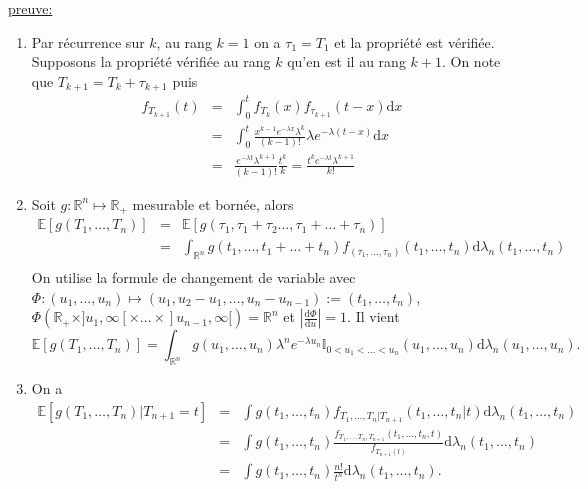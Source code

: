 \documentclass[8pt,notheorems]{beamer}
\theoremstyle{definition}
\theoremstyle{example}
\theoremstyle{mystyle}
\theoremstyle{plain}
\begin{document}
\begin{frame}[allowframebreaks]
\underline{preuve:}
\begin{enumerate}
\item Par récurrence sur $k$, au rang $k=1$ on a $\tau_1= T_1$ et la propriété est vérifiée. Supposons la propriété vérifiée au rang $k$ qu'en est il au rang $k+1$. On note que $T_{k+1}=T_k+\tau_{k+1}$ puis
\begin{eqnarray*}
f_{T_{k+1}}(t)&=&\int_{0}^{t}f_{T_k}(x)f_{\tau_{k+1}}(t-x)\text{d}x\\
&=&\int_{0}^{t}\frac{x^{k-1}e^{-\lambda x}\lambda^k}{(k-1)!}\lambda e^{-\lambda(t-x)}\text{d}x\\
&=&\frac{e^{-\lambda t}\lambda^{k+1}}{(k-1)!}\frac{t^k}{k}=\frac{t^k e^{-\lambda t}\lambda^{k+1}}{k!}
\end{eqnarray*}
\item Soit $g:\mathbb{R}^n\mapsto \mathbb{R}_+$ mesurable et bornée, alors
\begin{eqnarray*}
\mathbb{E}[g(T_{1},\ldots,T_n)]&=& \mathbb{E}[g(\tau_{1},\tau_1+\tau_2\ldots,\tau_1+\ldots+ \tau_n)]\\
&=&\int_{\mathbb{R}^n}g(t_{1},\ldots,t_1+\ldots+ t_n)f_{(\tau_{1},\ldots,\tau_n)}(t_1,\ldots,t_n)\text{d}\lambda_n(t_{1},\ldots,t_n)\\
\end{eqnarray*}
On utilise la formule de changement de variable avec $\Phi:(u_{1},\ldots,u_n)\mapsto(u_1, u_{2}-u_1,\ldots,u_n-u_{n-1}):=(t_1,\ldots, t_n)$,  $\Phi(\mathbb{R}_+\times ]u_1,\infty[\times \ldots\times ]u_{n-1},\infty[) = \mathbb{R}^n $ et $\left|\frac{\text{d}\Phi}{\text{d}u}\right|=1$. Il vient
$$
\mathbb{E}[g(T_{1},\ldots,T_n)]=\int_{\mathbb{R}^n} g(u_1,\ldots, u_n)\lambda^{n}e^{-\lambda u_n}\mathbb{I}_{0<u_1<\ldots<u_n}(u_1,\ldots, u_n)\text{d}\lambda_{n}(u_1,\ldots, u_n).
$$
\item On a 
\begin{eqnarray*}
\mathbb{E}\left[g(T_1,\ldots, T_n)|T_{n+1}=t\right] &=& \int g(t_1,\ldots,t_n)f_{T_1,\ldots, T_n|T_{n+1}}(t_1,\ldots,t_n|t)\text{d}\lambda_n(t_1,\ldots,t_n)\\
&=& \int g(t_1,\ldots,t_n)\frac{f_{T_1,\ldots, T_n,T_{n+1}}(t_1,\ldots,t_n,t)}{f_{T_{n+1}(t)}}\text{d}\lambda_n(t_1,\ldots,t_n)\\
&=& \int g(t_1,\ldots,t_n)\frac{n!}{t^n}\text{d}\lambda_n(t_1,\ldots,t_n).
\end{eqnarray*}

\end{enumerate}
\end{frame}
\end{document}
